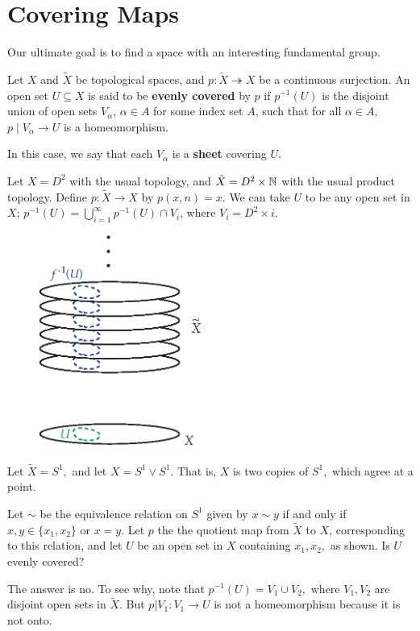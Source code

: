 \section{Covering Maps}

Our ultimate goal is to find a space with an interesting fundamental group.  

\begin{definition}  Let $X$ and $\tilde{X}$ be topological spaces, and $p:\tilde{X}\twoheadrightarrow X$ be a continuous surjection.  An open set $U \subseteq X$ is said to be \textbf{evenly covered} by $p$ if $p^{-1}(U)$ is the disjoint union of open sets $V_{\alpha}$, $\alpha \in A$ for some index set $A$, such that for all $\alpha \in A,$ $p \mid V_{\alpha} \rightarrow U$ is a homeomorphism.  

In this case, we say that each $V_{\alpha}$ is a \textbf{sheet} covering $U$.
\end{definition}


\begin{example}
 Let $X=D^2$ with the usual topology, and $\tilde{X}=D^2 \times \mathbb N$ with the usual product topology.  Define $p:\tilde{X} \rightarrow X$ by $p(x,n)=x.$  We can take $U$ to be any open set in $X$; $\displaystyle p^{-1}(U)=\bigcup_{i=1}^{\infty}p^{-1}(U)\cap V_i$, where $V_i=D^2 \times i$.

\begin{figure}[ht!]
    \centering
    \includegraphics[width=150pt]{images/covering_spaces/D2xN}
\end{figure}
\end{example}

\begin{example}
Let $\tilde{X}=S^1,$ and let $X=S^1 \lor S^1.$  That is, $X$ is two copies of $S^1,$ which agree at a point.  

Let $\sim$ be the equivalence relation on $S^1$ given by $x \sim y$ if and only if $x,y \in \{x_1,x_2\}$ or $x=y$.  Let $p$ the the quotient map from $\tilde{X}$ to $X$, corresponding to this relation, and let $U$ be an open set in $X$ containing $x_1,x_2,$ as shown.  Is $U$ evenly covered?

The answer is no.  To see why, note that $p^{-1}(U)=V_1 \cup V_2,$ where $V_1,V_2$ are disjoint open sets in $\tilde{X}$.  But $p \vert V_1: V_1 \rightarrow U$ is not a homeomorphism because it is not onto.  
\end{example}

